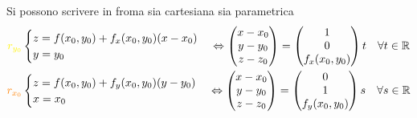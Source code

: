 \documentclass[a4paper, oneside]{article}
\begin{document}
        Si possono scrivere in froma sia cartesiana sia parametrica
        \begin{gather*}
            \textcolor{yellow}{r_{y_0}}
            \begin{cases}
                z = f(x_0,y_0) + f_x (x_0,y_0) (x-x_0)\\
                y = y_0
            \end{cases}
            \Leftrightarrow \begin{pmatrix}
                x-x_0\\
                y-y_0\\
                z-z_0
            \end{pmatrix} = 
            \begin{pmatrix}
                1\\
                0\\
                f_x(x_0,y_0)
            \end{pmatrix}t \quad  \forall t \in \mathbb{R}
            \\\textcolor{orange}{r_{x_0}}
            \begin{cases}
                z = f(x_0,y_0) + f_y (x_0,y_0) (y-y_0)\\
                x = x_0
            \end{cases}
            \Leftrightarrow \begin{pmatrix}
                x-x_0\\
                y-y_0\\
                z-z_0
            \end{pmatrix} = 
            \begin{pmatrix}
                0\\
                1\\
                f_y(x_0,y_0)
            \end{pmatrix}s \quad \forall s \in \mathbb{R}
        \end{gather*}   
        
\end{document}

